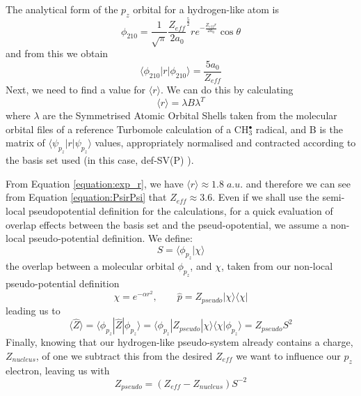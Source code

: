 \documentclass[journal=jctcce,manuscript=article]{achemso}
\begin{document}
The analytical form of the \(p_{z}\) orbital for a hydrogen-like atom is\cite{nyu_h_solutions}
\begin{equation}
\phi_{210} = \frac{1}{\sqrt{\pi}} \frac{Z_{eff}}{2a_{0}} ^{\frac{5}{2}} re^{-\frac{Z_{eff}r}{2a_{0}}} \cos \theta
\end{equation}
and from this we obtain 
\begin{equation}
\label{equation:PsirPsi}
\langle \phi_{210} | r | \phi_{210} \rangle = \frac{5a_{0}}{Z_{eff}}
\end{equation}
Next, we need to find a value for \( \langle r \rangle \). We can do this by calculating
\begin{equation}
\langle r \rangle = \lambda B \lambda^{T}
\label{equation:exp_r}
\end{equation}
where \(\lambda\) are the Symmetrised Atomic Orbital Shells taken from the molecular orbital files of a reference Turbomole calculation of a CH\(^{\bullet}_{3}\) radical, and B is the matrix of \(\langle \psi_{p_{z}} | r | \psi_{p_{z}} \rangle\) values, appropriately normalised and contracted according to the basis set used (in this case, def-SV(P) \cite{defsvp}).

From Equation \ref{equation:exp_r}, we have \( \langle r \rangle \approx 1.8\;a.u.\) and therefore we can see from Equation \ref{equation:PsirPsi} that \(Z_{eff} \approx 3.6\). Even if we shall use the semi-local pseudopotential definition for the calculations, for a quick evaluation of overlap effects between the basis set and the pseud-opotential, we assume a non-local pseudo-potential definition. We define:
\begin{equation}
S = \langle \phi_{p_{z}} | \chi \rangle
\end{equation}
the overlap between a molecular orbital \(\phi_{p_{z}}\), and \(\chi\), taken from our non-local pseudo-potential definition \cite{huzinaga_effective_1991}
\begin{equation}
\chi = e^{-\alpha r^{2}},\qquad \widehat{p} = Z_{pseudo} | \chi \rangle \langle \chi |
\end{equation}
leading us to
\begin{equation}
\langle \widehat{Z} \rangle = \langle \phi_{p_{z}} | \widehat{Z} | \phi_{p_{z}} \rangle = \langle \phi_{p_{z}} | Z_{pseudo} | \chi \rangle \langle \chi | \phi_{p_{z}} \rangle = Z_{pseudo} S^{2}
\end{equation}
Finally, knowing that our hydrogen-like pseudo-system already contains a charge, \(Z_{nucleus}\), of one we subtract this from the desired \(Z_{eff}\) we want to influence our \(p_{z}\) electron, leaving us with
\begin{equation}
Z_{pseudo} = (Z_{eff} - Z_{nucleus})S^{-2}
\end{equation}
\end{document}
